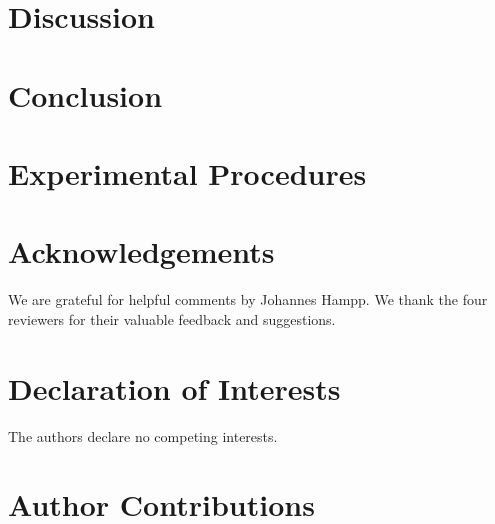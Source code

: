 \documentclass[11pt,preprint]{elsarticle}
\begin{document}





\section*{Discussion}
\label{sec:discussion}



\section*{Conclusion}
\label{sec:conclusion}



\section*{Experimental Procedures}
\label{sec:methods}



\section*{Acknowledgements}

We are grateful for helpful comments by Johannes Hampp. We thank the four
reviewers for their valuable feedback and suggestions.

\section*{Declaration of Interests}

The authors declare no competing interests.



\section*{Author Contributions}
\end{document}
